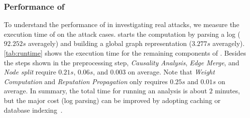 

\subsubsection{Performance of \tool}
To understand the performance of \tool in investigating real attacks, we measure the execution time of \tool on the attack cases.
\tool starts the computation by parsing a log ($92.252s$ averagely) and building a global graph representation ($3.277s$ averagely).
\cref{tab:runtime} shows the execution time for the remaining components of \tool. 
Besides the steps shown in the preprocessing step, \emph{Causality Analysis}, \emph{Edge Merge}, and \emph{Node split} require $0.21s$, $0.06s$, and $0.003$ on average. 
Note that \emph{Weight Computation} and \emph{Reputation Propagation} only requires $0.25s$ and $0.01s$ on average.
In summary, the total time for running an analysis is about $2$ minutes, but the major cost (\ie log parsing) can be improved by adopting caching or database indexing~\cite{gao2018aiql}.